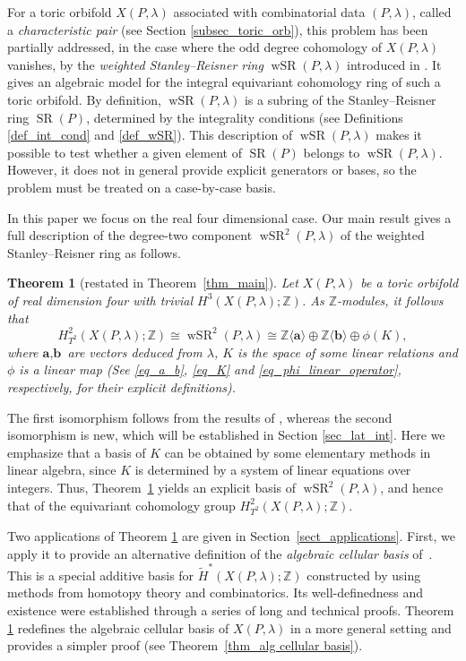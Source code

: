 \documentclass[10pt]{amsart}
\theoremstyle{plain}
\newtheorem{theorem}{Theorem}[section]
\theoremstyle{definition}
\numberwithin{equation}{section}
\newcommand{\ZZ}{\mathbb{Z}}
\DeclareMathOperator{\wSR}{wSR}
\DeclareMathOperator{\SR}{SR}
\begin{document}
For a toric orbifold $X(P, \lambda)$ associated with combinatorial data $(P, \lambda)$, called a \emph{characteristic pair} (see Section \ref{subsec_toric_orb}), this problem has been partially addressed, in the case where the odd degree cohomology of $X(P, \lambda)$ vanishes, by the \emph{weighted Stanley--Reisner ring} $\wSR(P, \lambda)$ introduced in \cite{BSS, DKS}. It gives an algebraic model for the integral equivariant cohomology ring of such a toric orbifold. By definition, $\wSR(P,\lambda)$ is a subring of the Stanley--Reisner ring $\SR(P)$, determined by the integrality conditions (see Definitions \ref{def_int_cond} and \ref{def_wSR}). This description of $\wSR(P, \lambda)$ makes it possible to test whether a given element of $\SR(P)$ belongs to $\wSR(P,\lambda)$. However, it does not in general provide explicit generators or bases, so the problem must be treated on a case-by-case basis.

In this paper we focus on the real four dimensional case.
Our main result gives a full description of the degree-two component $\wSR^2(P,\lambda)$ of the weighted Stanley--Reisner ring as follows.


\begin{theorem}[restated in Theorem~\ref{thm_main}]\label{thm_main intro}
Let $X(P,\lambda)$ be a toric orbifold of real dimension four with trivial $H^3(X(P,\lambda);\ZZ)$. As $\ZZ$-modules, it follows that 
\[
H^2_{T^2}(X(P,\lambda);\ZZ)\cong\wSR^2(P,\lambda)\cong\ZZ\langle \textbf{a}\rangle\oplus\ZZ\langle\textbf{b}\rangle\oplus\phi(K),
\]
where $\textbf{a},\textbf{b}$ are vectors deduced from $\lambda$, $K$ is the space of some linear relations and  $\phi$ is a linear map (See \eqref{eq_a_b}, \eqref{eq_K} and \eqref{eq_phi_linear_operator}, respectively, for their explicit definitions). 
\end{theorem}

The first isomorphism follows from the results of \cite{BSS,DKS}, whereas the second isomorphism is new, which will be established in Section \ref{sec_lat_int}. Here we emphasize that a basis of $K$ can be obtained by some elementary methods in linear algebra, since $K$ is determined by a system of linear equations over integers. Thus, Theorem~\ref{thm_main intro} yields an explicit basis of $\wSR^2(P,\lambda)$, and hence that of the equivariant cohomology group $ H^2_{T^2}(X(P,\lambda);\ZZ)$.



Two applications of Theorem \ref{thm_main intro} are given in Section~\ref{sect_applications}.
First, we apply it to provide an alternative definition of the \emph{algebraic cellular basis} of~\cite{FSS2}. This is a special additive basis for $\tilde{H}^*(X(P,\lambda);\ZZ)$ constructed by using methods from homotopy theory and combinatorics. Its well-definedness and existence were established through a series of long and technical proofs. Theorem \ref{thm_main intro} redefines the algebraic cellular basis of $X(P, \lambda)$ in a more general setting and provides a simpler proof (see Theorem~\ref{thm_alg cellular basis}).
\end{document}
